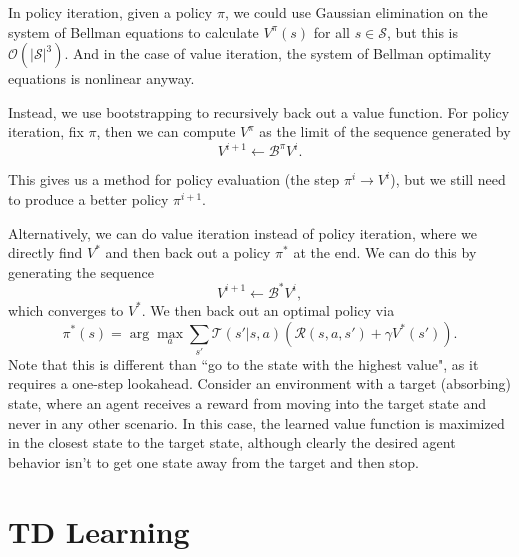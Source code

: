 \documentclass[twoside,10pt]{report}
\begin{document}
In policy iteration, given a policy $\pi$, we could use Gaussian elimination on the system of Bellman equations to calculate $V^{\pi}(s)$ for all $s \in \mathcal{S}$, but this is $\mathcal{O}(|\mathcal{S}|^{3})$. And in the case of value iteration, the system of Bellman optimality equations is nonlinear anyway.

Instead, we use bootstrapping to recursively back out a value function. For policy iteration, fix $\pi$, then we can compute $V^{\pi}$ as the limit of the sequence generated by
\[
V^{i+1} \gets \mathcal{B}^{\pi} V^{i}.
\] 

This gives us a method for policy evaluation (the step $\pi^{i} \to V^{i}$), but we still need to produce a better policy $\pi^{i+1}$.


Alternatively, we can do value iteration instead of policy iteration, where we directly find $V^{*}$ and then back out a policy $\pi^{*}$ at the end. We can do this by generating the sequence
\[
V^{i+1} \gets \mathcal{B}^{*} V^{i},
\] which converges to $V^{*}$. We then back out an optimal policy via
\[
	\pi^{*}(s) = \arg \max_{a} \sum_{s'} \mathcal{T}(s'|s,a) \left( \mathcal{R}(s,a,s') + \gamma V^{*}(s') \right).
\]
Note that this is different than ``go to the state with the highest value", as it requires a one-step lookahead. Consider an environment with a target (absorbing) state, where an agent receives a reward from moving into the target state and never in any other scenario. In this case, the learned value function is maximized in the closest state to the target state, although clearly the desired agent behavior isn't to get one state away from the target and then stop.


\section{TD Learning}

\end{document}
